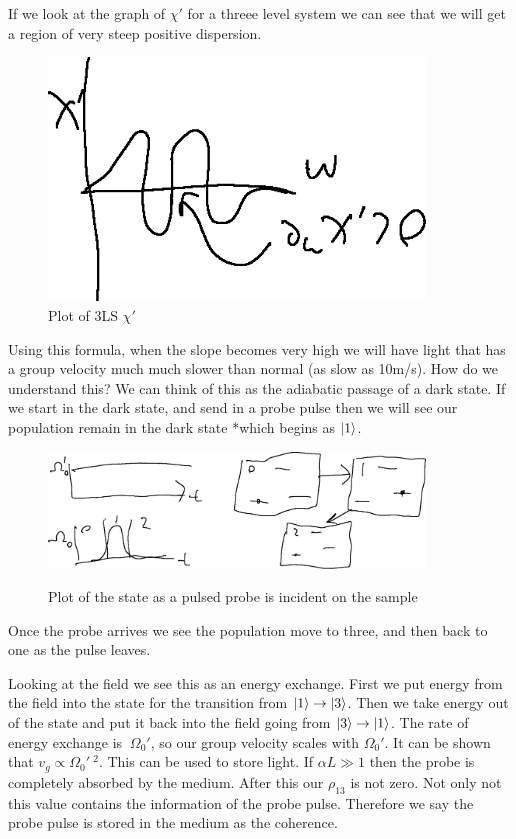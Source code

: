If we look at the graph of $\chi'$ for a threee level system we can see that we will get a region of very steep positive dispersion.
\begin{figure}[h!]
	\centering
	\includegraphics[width=10cm]{images/11-26-1.png}
	\caption*{Plot of 3LS $\chi'$}
\end{figure}
Using this formula, when the slope becomes very high we will have light that has a group velocity much much slower than normal (as slow as 10m/s).
How do we understand this? We can think of this as the adiabatic passage of a dark state. If we start in the dark state, and send in a probe pulse then we will see our population remain in the dark state *which begins as $\ket{1}$.
\begin{figure}[h!]
	\centering
	\includegraphics[width=10cm]{images/11-26-2.png} \\
	\caption*{Plot of the state as a pulsed probe is incident on the sample}
\end{figure}
Once the probe arrives we see the population move to three, and then back to one as the pulse leaves.

Looking at the field we see this as an energy exchange. First we put energy from the field into the state for the transition from $\ket{1}\to\ket{3}$. Then we take energy out of the state and put it back into the field going from $\ket{3}\to\ket{1}$.
The rate of energy exchange is $~\Omega_0'$, so our group velocity scales with $\Omega_0'$. It can be shown that $v_g\propto\Omega_0'\ ^2$. This can be used to store light. If $\alpha L \gg 1$ then the probe is completely absorbed by the medium.
After this our $\rho_{13}$ is not zero. Not only not this value contains the information of the probe pulse. Therefore we say the probe pulse is stored in the medium as the coherence.

